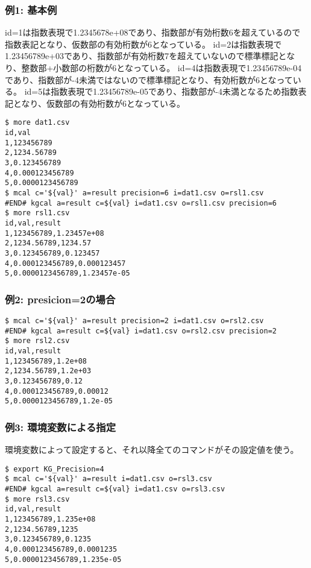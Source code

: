 \subsubsection*{例1: 基本例}

id=1は指数表現で1.2345678e+08であり、指数部が有効桁数6を超えているので指数表記となり、仮数部の有効桁数が6となっている。
id=2は指数表現で1.23456789e+03であり、指数部が有効桁数7を超えていないので標準標記となり、整数部+小数部の桁数が6となっている。
id=4は指数表現で1.23456789e-04であり、指数部が-4未満ではないので標準標記となり、有効桁数が6となっている。
id=5は指数表現で1.23456789e-05であり、指数部が-4未満となるため指数表記となり、仮数部の有効桁数が6となっている。


\begin{Verbatim}[baselinestretch=0.7,frame=single]
$ more dat1.csv
id,val
1,123456789
2,1234.56789
3,0.123456789
4,0.000123456789
5,0.0000123456789
$ mcal c='${val}' a=result precision=6 i=dat1.csv o=rsl1.csv
#END# kgcal a=result c=${val} i=dat1.csv o=rsl1.csv precision=6
$ more rsl1.csv
id,val,result
1,123456789,1.23457e+08
2,1234.56789,1234.57
3,0.123456789,0.123457
4,0.000123456789,0.000123457
5,0.0000123456789,1.23457e-05
\end{Verbatim}
\subsubsection*{例2: presicion=2の場合}



\begin{Verbatim}[baselinestretch=0.7,frame=single]
$ mcal c='${val}' a=result precision=2 i=dat1.csv o=rsl2.csv
#END# kgcal a=result c=${val} i=dat1.csv o=rsl2.csv precision=2
$ more rsl2.csv
id,val,result
1,123456789,1.2e+08
2,1234.56789,1.2e+03
3,0.123456789,0.12
4,0.000123456789,0.00012
5,0.0000123456789,1.2e-05
\end{Verbatim}
\subsubsection*{例3: 環境変数による指定}

環境変数によって設定すると、それ以降全てのコマンドがその設定値を使う。


\begin{Verbatim}[baselinestretch=0.7,frame=single]
$ export KG_Precision=4
$ mcal c='${val}' a=result i=dat1.csv o=rsl3.csv
#END# kgcal a=result c=${val} i=dat1.csv o=rsl3.csv
$ more rsl3.csv
id,val,result
1,123456789,1.235e+08
2,1234.56789,1235
3,0.123456789,0.1235
4,0.000123456789,0.0001235
5,0.0000123456789,1.235e-05
\end{Verbatim}
